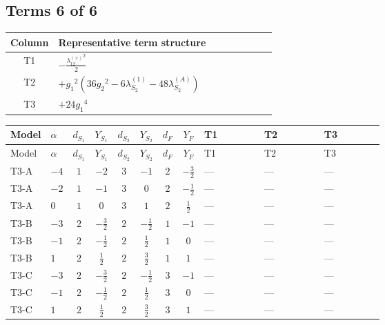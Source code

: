 \documentclass[8pt]{article}
\begin{document}
\begin{landscape}
\subsection*{Terms 6 of 6}
\begin{center}
\begin{tabular}{@{}c >{\raggedright\arraybackslash}p{0.82\linewidth}@{}}
\toprule
Column & Representative term structure \\
\midrule
T1 & \(\displaystyle -\frac{{\lambda_{12}^{(\times)}}^2}{2}\) \\
\midrule
T2 & \(\displaystyle +{g_1}^2 \left(36 {g_2}^2-6 {\lambda_{S_2}^{(1)}}-48 {\lambda_{S_2}^{(A)}}\right)\) \\
\midrule
T3 & \(\displaystyle +24 {g_1}^4\) \\
\midrule
\bottomrule
\end{tabular}
\end{center}
\smallskip
\tiny
\begin{longtable}{@{}llcccccc >{\raggedright\arraybackslash}p{0.21\linewidth} >{\raggedright\arraybackslash}p{0.21\linewidth} >{\raggedright\arraybackslash}p{0.21\linewidth}@{}}
\toprule
Model & $\alpha$ & $d_{S_1}$ & $Y_{S_1}$ & $d_{S_2}$ & $Y_{S_2}$ & $d_F$ & $Y_F$ & T1 & T2 & T3 \\
\midrule
\endfirsthead
\toprule
Model & $\alpha$ & $d_{S_1}$ & $Y_{S_1}$ & $d_{S_2}$ & $Y_{S_2}$ & $d_F$ & $Y_F$ & T1 & T2 & T3 \\
\midrule
\endhead
T3-A & $-4$ & $1$ & $-2$ & $3$ & $-1$ & $2$ & $-\frac{3}{2}$ & --- & --- & --- \\
\midrule
T3-A & $-2$ & $1$ & $-1$ & $3$ & $0$ & $2$ & $-\frac{1}{2}$ & --- & --- & --- \\
\midrule
T3-A & $0$ & $1$ & $0$ & $3$ & $1$ & $2$ & $\frac{1}{2}$ & --- & --- & --- \\
\midrule
T3-B & $-3$ & $2$ & $-\frac{3}{2}$ & $2$ & $-\frac{1}{2}$ & $1$ & $-1$ & --- & --- & --- \\
\midrule
T3-B & $-1$ & $2$ & $-\frac{1}{2}$ & $2$ & $\frac{1}{2}$ & $1$ & $0$ & --- & --- & --- \\
\midrule
T3-B & $1$ & $2$ & $\frac{1}{2}$ & $2$ & $\frac{3}{2}$ & $1$ & $1$ & --- & --- & --- \\
\midrule
T3-C & $-3$ & $2$ & $-\frac{3}{2}$ & $2$ & $-\frac{1}{2}$ & $3$ & $-1$ & --- & --- & --- \\
\midrule
T3-C & $-1$ & $2$ & $-\frac{1}{2}$ & $2$ & $\frac{1}{2}$ & $3$ & $0$ & --- & --- & --- \\
\midrule
T3-C & $1$ & $2$ & $\frac{1}{2}$ & $2$ & $\frac{3}{2}$ & $3$ & $1$ & --- & --- & --- \\

\end{longtable}
\end{landscape}
\end{document}
